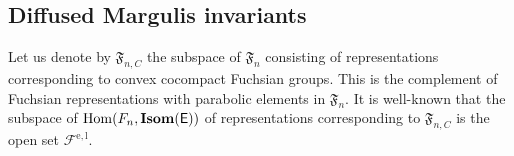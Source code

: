 \documentclass{amsart}
\numberwithin{equation}{section}
\newcommand\Hom{{\rm Hom}}
\newcommand\Isom{{\mathbf{Isom}}}
\newcommand\Lspace{\mathsf E}
\theoremstyle{definition}
\theoremstyle{remark}
\newcommand{\rome}{\mathrm e}
\newcommand{\romel}{{\mathrm{e}, \mathrm{l}}}
\begin{document}


\subsection{Diffused Margulis invariants} 

Let us denote by $\mathfrak{F}_{n, C}$ the subspace of $\mathfrak{F}_n$ consisting 
of representations corresponding to convex cocompact Fuchsian groups. 
This is the complement of Fuchsian representations with parabolic elements in  $\mathfrak{F}_n$. 
It is well-known that the subspace of $\Hom(F_n, \Isom(\Lspace))$ of representations 
corresponding to  $\mathfrak{F}_{n, C}$ is the open set 
$\mathcal{F}^{\romel}$.  
\end{document}
